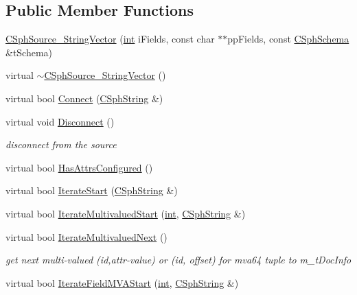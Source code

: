\subsection*{Public Member Functions}
\begin{DoxyCompactItemize}
\item 
\hyperlink{classCSphSource__StringVector_afc438995f24d9694ea4061f246299ba0}{C\-Sph\-Source\-\_\-\-String\-Vector} (\hyperlink{sphinxexpr_8cpp_a4a26e8f9cb8b736e0c4cbf4d16de985e}{int} i\-Fields, const char $\ast$$\ast$pp\-Fields, const \hyperlink{classCSphSchema}{C\-Sph\-Schema} \&t\-Schema)
\item 
virtual \hyperlink{classCSphSource__StringVector_a61276d9d0f439f3f683abe6b3e2dbecf}{$\sim$\-C\-Sph\-Source\-\_\-\-String\-Vector} ()
\item 
virtual bool \hyperlink{classCSphSource__StringVector_a10e2e9c807ad5011c00f6661d5ddc844}{Connect} (\hyperlink{structCSphString}{C\-Sph\-String} \&)
\item 
virtual void \hyperlink{classCSphSource__StringVector_a58679b654e01091835fee32a4e605297}{Disconnect} ()
\begin{DoxyCompactList}\small\item\em disconnect from the source \end{DoxyCompactList}\item 
virtual bool \hyperlink{classCSphSource__StringVector_a86359f1aabfb01356a52d48629a63474}{Has\-Attrs\-Configured} ()
\item 
virtual bool \hyperlink{classCSphSource__StringVector_aca5fc9c9daae776478f76138cacce381}{Iterate\-Start} (\hyperlink{structCSphString}{C\-Sph\-String} \&)
\item 
virtual bool \hyperlink{classCSphSource__StringVector_ae9cc56033292c551a55e94b693e4888d}{Iterate\-Multivalued\-Start} (\hyperlink{sphinxexpr_8cpp_a4a26e8f9cb8b736e0c4cbf4d16de985e}{int}, \hyperlink{structCSphString}{C\-Sph\-String} \&)
\item 
virtual bool \hyperlink{classCSphSource__StringVector_a2706604a4e244484001dd68fd368bfb9}{Iterate\-Multivalued\-Next} ()
\begin{DoxyCompactList}\small\item\em get next multi-\/valued (id,attr-\/value) or (id, offset) for mva64 tuple to m\-\_\-t\-Doc\-Info \end{DoxyCompactList}\item 
virtual bool \hyperlink{classCSphSource__StringVector_aa17ac75b4d0d96a78d131d8bad983a6f}{Iterate\-Field\-M\-V\-A\-Start} (\hyperlink{sphinxexpr_8cpp_a4a26e8f9cb8b736e0c4cbf4d16de985e}{int}, \hyperlink{structCSphString}{C\-Sph\-String} \&)
$$
\end{DoxyCompactItemize}
